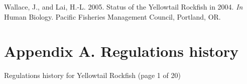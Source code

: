 \documentclass[12pt,]{article}
\begin{document}
\hypertarget{ref-Wallace2005}{}
Wallace, J., and Lai, H.-L. 2005. Status of the Yellowtail Rockfish in
2004. \emph{In} Human Biology. Pacific Fisheries Management Council,
Portland, OR.

\renewcommand{\thefigure}{\arabic{figure}}
\renewcommand{\thetable}{\arabic{table}}

\setcounter{figure}{0} \setcounter{table}{0} \newpage

\FloatBarrier

\section*{Appendix A. Regulations
history}\label{appendix-a.-regulations-history}

\label{sec:AppendixA}

Regulations history for Yellowtail Rockfish (page 1 of 20)
\begingroup\fontsize{9pt}{10pt}\selectfont
\end{document}
